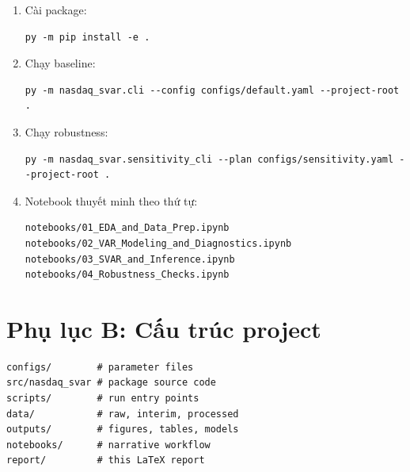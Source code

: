 \documentclass[12pt,a4paper]{article}
\begin{document}
\begin{enumerate}[leftmargin=1.5em]
    \item Cài package:
\begin{verbatim}
py -m pip install -e .
\end{verbatim}
    \item Chạy baseline:
\begin{verbatim}
py -m nasdaq_svar.cli --config configs/default.yaml --project-root .
\end{verbatim}
    \item Chạy robustness:
\begin{verbatim}
py -m nasdaq_svar.sensitivity_cli --plan configs/sensitivity.yaml --project-root .
\end{verbatim}
    \item Notebook thuyết minh theo thứ tự:
\begin{verbatim}
notebooks/01_EDA_and_Data_Prep.ipynb
notebooks/02_VAR_Modeling_and_Diagnostics.ipynb
notebooks/03_SVAR_and_Inference.ipynb
notebooks/04_Robustness_Checks.ipynb
\end{verbatim}
\end{enumerate}

\section{Phụ lục B: Cấu trúc project}

\begin{verbatim}
configs/        # parameter files
src/nasdaq_svar # package source code
scripts/        # run entry points
data/           # raw, interim, processed
outputs/        # figures, tables, models
notebooks/      # narrative workflow
report/         # this LaTeX report
\end{verbatim}

\newpage


\end{document}
